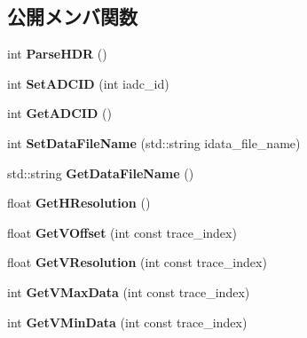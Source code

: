 \subsection*{公開メンバ関数}
\begin{DoxyCompactItemize}
\item 
\mbox{\label{class_t_k_d_a_t_a_ad142911ef868b94bd2607ab4ca69f84d}} 
int {\bfseries Parse\+H\+DR} ()
\item 
\mbox{\label{class_t_k_d_a_t_a_a64f288a761012bf276a5aa7f74dfcb44}} 
int {\bfseries Set\+A\+D\+C\+ID} (int iadc\+\_\+id)
\item 
\mbox{\label{class_t_k_d_a_t_a_ad0a8defdf8de2ef2bbe42d7d8a53e051}} 
int {\bfseries Get\+A\+D\+C\+ID} ()
\item 
\mbox{\label{class_t_k_d_a_t_a_ae63b673fda97ff6fef659f51fe40dbe8}} 
int {\bfseries Set\+Data\+File\+Name} (std\+::string idata\+\_\+file\+\_\+name)
\item 
\mbox{\label{class_t_k_d_a_t_a_a3f354a0eb29025867cbd1e3e27f8e41a}} 
std\+::string {\bfseries Get\+Data\+File\+Name} ()
\item 
\mbox{\label{class_t_k_d_a_t_a_a0f0c38948586490c1bfe1f820418c5ef}} 
float {\bfseries Get\+H\+Resolution} ()
\item 
\mbox{\label{class_t_k_d_a_t_a_a6c83babefbef168db08ca1c00cfe560d}} 
float {\bfseries Get\+V\+Offset} (int const trace\+\_\+index)
\item 
\mbox{\label{class_t_k_d_a_t_a_a78fccdabf4c7326ecb9dbe30ebe765e4}} 
float {\bfseries Get\+V\+Resolution} (int const trace\+\_\+index)
\item 
\mbox{\label{class_t_k_d_a_t_a_aaa91499a0c86542c6d240f07b2c7a5a6}} 
int {\bfseries Get\+V\+Max\+Data} (int const trace\+\_\+index)
\item 
\mbox{\label{class_t_k_d_a_t_a_aed38093c0f7a086ab190c89770567531}} 
int {\bfseries Get\+V\+Min\+Data} (int const trace\+\_\+index)

\end{DoxyCompactItemize}
